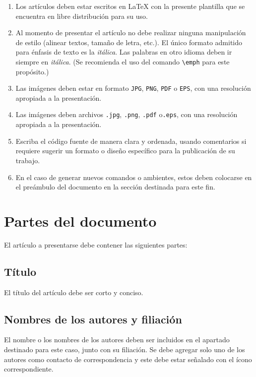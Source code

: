\documentclass{aleph-revista}
\begin{document}
\begin{enumerate}
\item 
    Los artículos deben estar escritos en \LaTeX{} con la presente plantilla que se encuentra en libre distribución para su uso.
\item 
    Al momento de presentar el artículo no debe realizar ninguna manipulación de estilo (alinear textos, tamaño de letra, etc.). El único formato admitido para énfasis de texto es la \textit{itálica}. Las palabras en otro idioma deben ir siempre en \textit{itálica}. (Se recomienda el uso del comando \verb|\emph| para este propósito.)
\item 
    Las imágenes deben estar en formato \texttt{JPG}, \texttt{PNG}, \texttt{PDF} o \texttt{EPS}, con una resolución apropiada a la presentación.
\item 
    Las imágenes deben archivos \texttt{.jpg}, \texttt{.png}, \texttt{.pdf} o\texttt{.eps}, con una resolución apropiada a la presentación.
\item 
    Escriba el código fuente de manera clara y ordenada, usando comentarios si requiere sugerir un formato o diseño específico para la publicación de su trabajo. 
\item 
    En el caso de generar nuevos comandos o ambientes, estos deben colocarse en el preámbulo del documento en la sección destinada para este fin.
\end{enumerate}

\section{Partes del documento}

El artículo a presentarse debe contener las siguientes partes:

\subsection{Título}

El título del artículo debe ser corto y conciso.

\subsection{Nombres de los autores y filiación}

El nombre o los nombres de los autores deben ser incluidos en el apartado destinado para este caso, junto con su filiación. Se debe agregar solo uno de los autores como contacto de correspondencia y este debe estar señalado con el ícono correspondiente.
\end{document}
